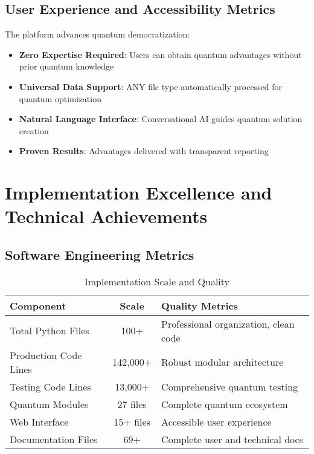 \documentclass[12pt,a4paper]{article}
\begin{document}
\subsection{User Experience and Accessibility Metrics}

The platform advances quantum democratization:

\begin{itemize}
    \item \textbf{Zero Expertise Required}: Users can obtain quantum advantages without prior quantum knowledge
    \item \textbf{Universal Data Support}: ANY file type automatically processed for quantum optimization
    \item \textbf{Natural Language Interface}: Conversational AI guides quantum solution creation
    \item \textbf{Proven Results}: Advantages delivered with transparent reporting
\end{itemize}

\section{Implementation Excellence and Technical Achievements}

\subsection{Software Engineering Metrics}

\begin{table}[H]
\centering
\caption{Implementation Scale and Quality}
\begin{tabular}{|l|c|l|}
\hline
\textbf{Component} & \textbf{Scale} & \textbf{Quality Metrics} \\
\hline
Total Python Files & 100+ & Professional organization, clean code \\
Production Code Lines & 142{,}000+ & Robust modular architecture \\
Testing Code Lines & 13{,}000+ & Comprehensive quantum testing \\
Quantum Modules & 27 files & Complete quantum ecosystem \\
Web Interface & 15+ files & Accessible user experience \\
Documentation Files & 69+ & Complete user and technical docs \\
\hline
\end{tabular}
\end{table}
\end{document}
